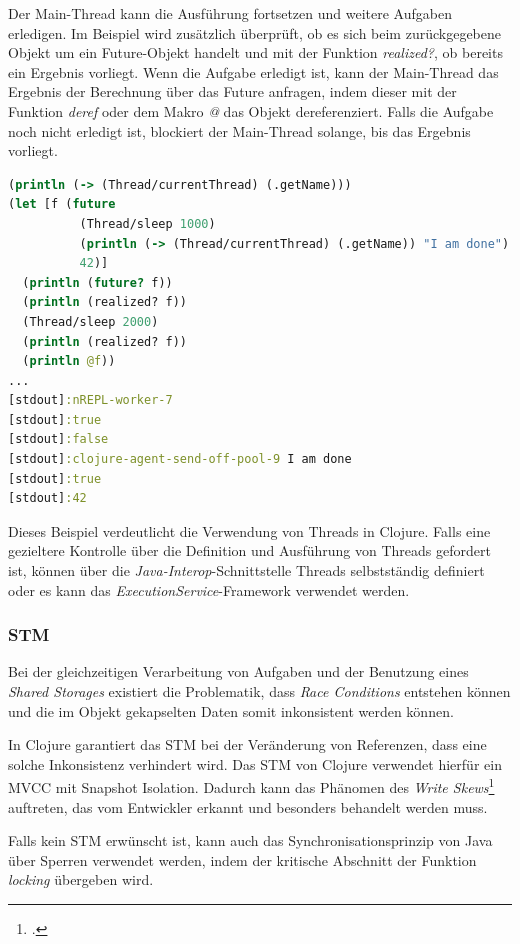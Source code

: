 \documentclass[12pt,a4paper,parskip=half,listof=totoc]{scrreprt}
\begin{document}
Der Main-Thread kann die Ausführung fortsetzen und weitere Aufgaben erledigen. Im Beispiel wird zusätzlich überprüft, ob es sich beim zurückgegebene Objekt um ein Future-Objekt handelt und mit der Funktion  \textit{realized?}, ob bereits ein Ergebnis vorliegt. Wenn die Aufgabe erledigt ist, kann der Main-Thread das Ergebnis der Berechnung über das Future anfragen, indem dieser mit der Funktion \textit{deref} oder dem Makro \textit{@} das Objekt dereferenziert. Falls die Aufgabe noch nicht erledigt ist, blockiert der Main-Thread solange, bis das Ergebnis vorliegt.

\begin{lstlisting}[language=Clojure,caption=Das asynchrone Ausführen von Befehlen mit der Funktion \textit{future},label=lst:clojure_future]
(println (-> (Thread/currentThread) (.getName)))
(let [f (future
          (Thread/sleep 1000)
          (println (-> (Thread/currentThread) (.getName)) "I am done")
          42)]
  (println (future? f))
  (println (realized? f))
  (Thread/sleep 2000)
  (println (realized? f))
  (println @f))
...
[stdout]:nREPL-worker-7
[stdout]:true
[stdout]:false
[stdout]:clojure-agent-send-off-pool-9 I am done
[stdout]:true
[stdout]:42
\end{lstlisting}

Dieses Beispiel verdeutlicht die Verwendung von Threads in Clojure. Falls eine gezieltere Kontrolle über die Definition und Ausführung von Threads gefordert ist, können über die \textit{Java-Interop}-Schnittstelle Threads selbstständig definiert oder es kann das \textit{ExecutionService}-Framework verwendet werden.

\subsubsection*{\acl{STM}}
Bei der gleichzeitigen Verarbeitung von Aufgaben und der Benutzung eines \textit{Shared Storages} existiert die Problematik, dass \textit{Race Conditions} entstehen können und die im Objekt gekapselten Daten somit inkonsistent werden können.

In Clojure garantiert das \acf{STM} bei der Veränderung von Referenzen, dass eine solche Inkonsistenz verhindert wird. Das \acs{STM} von Clojure verwendet hierfür ein \ac{MVCC} mit Snapshot Isolation. Dadurch kann das Phänomen des \textit{Write Skews}\footcite[S. Seite 17]{RENZSTATE} auftreten, das vom Entwickler erkannt und besonders behandelt werden muss.

Falls kein \ac{STM} erwünscht ist, kann auch das Synchronisationsprinzip von Java über Sperren verwendet werden, indem der kritische Abschnitt der Funktion \textit{locking} übergeben wird.
\end{document}
